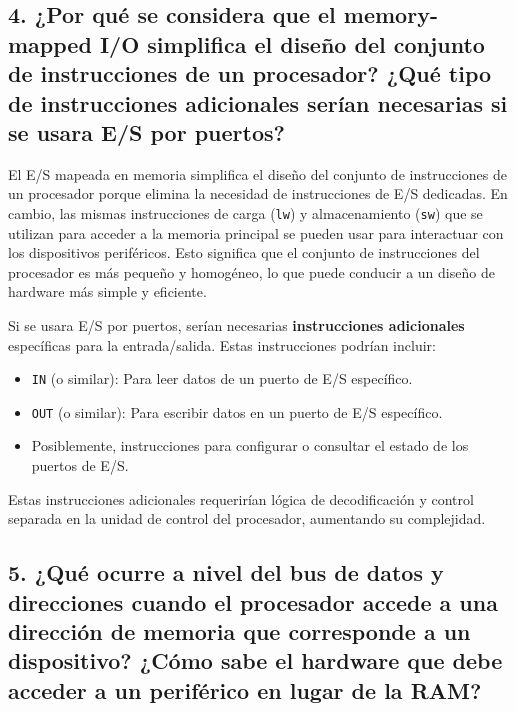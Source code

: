 \documentclass[12pt]{article}
\begin{document}
\subsection*{4. ¿Por qué se considera que el memory-mapped I/O simplifica el diseño del conjunto de instrucciones de un procesador? ¿Qué tipo de instrucciones adicionales serían necesarias si se usara E/S por puertos?}

El E/S mapeada en memoria simplifica el diseño del conjunto de instrucciones de un procesador porque elimina la necesidad de instrucciones de E/S dedicadas. En cambio, las mismas instrucciones de carga (\texttt{lw}) y almacenamiento (\texttt{sw}) que se utilizan para acceder a la memoria principal se pueden usar para interactuar con los dispositivos periféricos. Esto significa que el conjunto de instrucciones del procesador es más pequeño y homogéneo, lo que puede conducir a un diseño de hardware más simple y eficiente.

Si se usara E/S por puertos, serían necesarias \textbf{instrucciones adicionales} específicas para la entrada/salida. Estas instrucciones podrían incluir:
\begin{itemize}
    \item \texttt{IN} (o similar): Para leer datos de un puerto de E/S específico.
    \item \texttt{OUT} (o similar): Para escribir datos en un puerto de E/S específico.
    \item Posiblemente, instrucciones para configurar o consultar el estado de los puertos de E/S.
\end{itemize}
Estas instrucciones adicionales requerirían lógica de decodificación y control separada en la unidad de control del procesador, aumentando su complejidad.

\subsection*{5. ¿Qué ocurre a nivel del bus de datos y direcciones cuando el procesador accede a una dirección de memoria que corresponde a un dispositivo? ¿Cómo sabe el hardware que debe acceder a un periférico en lugar de la RAM?}
\end{document}
